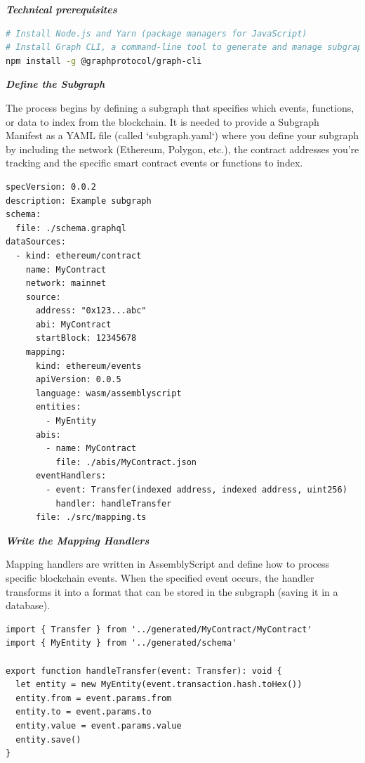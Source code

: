 \documentclass[11pt,a4paper,titlepage]{scrartcl}
\begin{document}
\textbf{\textit{Technical prerequisites}}
\begin{lstlisting}[language=bash, caption={Installation Commands for Subgraph Setup}, label={lst:install_commands}, basicstyle=\ttfamily\scriptsize]
# Install Node.js and Yarn (package managers for JavaScript)
# Install Graph CLI, a command-line tool to generate and manage subgraphs
npm install -g @graphprotocol/graph-cli
\end{lstlisting}



\textbf{\textit{Define the Subgraph}}

The process begins by defining a subgraph that specifies which events, functions, or data  to index from the blockchain. It is needed to provide a Subgraph Manifest as a YAML file (called `subgraph.yaml`) where you define your subgraph by including the network (Ethereum, Polygon, etc.), the contract addresses you're tracking and the specific smart contract events or functions to index.

\begin{lstlisting}[language=xml, caption={Example subgraph.yaml}, label={lst:subgraph_yaml}, basicstyle=\ttfamily\scriptsize]
specVersion: 0.0.2
description: Example subgraph
schema:
  file: ./schema.graphql
dataSources:
  - kind: ethereum/contract
    name: MyContract
    network: mainnet
    source:
      address: "0x123...abc"
      abi: MyContract
      startBlock: 12345678
    mapping:
      kind: ethereum/events
      apiVersion: 0.0.5
      language: wasm/assemblyscript
      entities:
        - MyEntity
      abis:
        - name: MyContract
          file: ./abis/MyContract.json
      eventHandlers:
        - event: Transfer(indexed address, indexed address, uint256)
          handler: handleTransfer
      file: ./src/mapping.ts
\end{lstlisting}
   

\textbf{\textit{Write the Mapping Handlers}}

Mapping handlers are written in AssemblyScript and define how to process specific blockchain events. When the specified event occurs, the handler transforms it into a format that can be stored in the subgraph (saving it in a database).


\begin{lstlisting}[language=xml, caption={Example handler for a Transfer event}, label={lst:transfer_handler}, basicstyle=\ttfamily\scriptsize]
import { Transfer } from '../generated/MyContract/MyContract'
import { MyEntity } from '../generated/schema'

export function handleTransfer(event: Transfer): void {
  let entity = new MyEntity(event.transaction.hash.toHex())
  entity.from = event.params.from
  entity.to = event.params.to
  entity.value = event.params.value
  entity.save()
}
\end{lstlisting}
  
\end{document}

